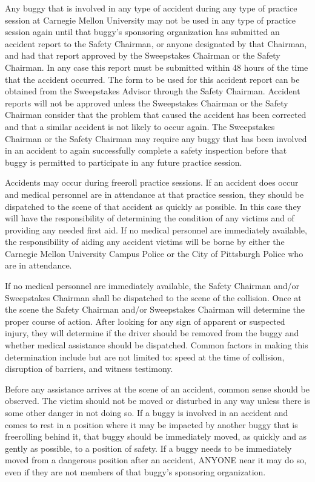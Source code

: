 	Any buggy that is involved in any type of accident during any type of practice
	session at Carnegie Mellon University may not be used in any type of practice
	session again until that buggy's sponsoring organization has submitted an
	accident report to the Safety Chairman, or anyone designated by that Chairman,
	and had that report approved by the Sweepstakes Chairman or the Safety
	Chairman. In any case this report must be submitted within 48 hours of the time
	that the accident occurred. The form to be used for this accident report can be
	obtained from the Sweepstakes Advisor through the Safety Chairman. Accident
	reports will not be approved unless the Sweepstakes Chairman or the Safety
	Chairman consider that the problem that caused the accident has been corrected
	and that a similar accident is not likely to occur again. The Sweepstakes
	Chairman or the Safety Chairman may require any buggy that has been involved in
	an accident to again successfully complete a safety inspection before that
	buggy is permitted to participate in any future practice session.
	\newline

	Accidents may occur during freeroll practice sessions. If an accident does
	occur and medical personnel are in attendance at that practice session, they
	should be dispatched to the scene of that accident as quickly as possible. In
	this case they will have the responsibility of determining the condition of any
	victims and of providing any needed first aid. If no medical personnel are
	immediately available, the responsibility of aiding any accident victims will
	be borne by either the Carnegie Mellon University Campus Police or the City of
	Pittsburgh Police who are in attendance.

	If no medical personnel are immediately available, the Safety Chairman
	and/or Sweepstakes Chairman shall be dispatched to the scene of the collision.
	Once at the scene the Safety Chairman and/or Sweepstakes Chairman will
	determine the proper course of action. After looking for any sign of apparent
	or suspected injury, they will determine if the driver should be removed from
	the buggy and whether medical assistance should be dispatched. Common factors
	in making this determination include but are not limited to: speed at the time
	of collision, disruption of barriers, and witness testimony. 

	Before any assistance arrives at the scene of an accident, common sense should
	be observed. The victim should not be moved or disturbed in any way unless
	there is some other danger in not doing so. If a buggy is involved in an
	accident and comes to rest in a position where it may be impacted by another
	buggy that is freerolling behind it, that buggy should be immediately moved, as
	quickly and as gently as possible, to a position of safety. If a buggy needs to
	be immediately moved from a dangerous position after an accident, ANYONE near
	it may do so, even if they are not members of that buggy's sponsoring
	organization. 

